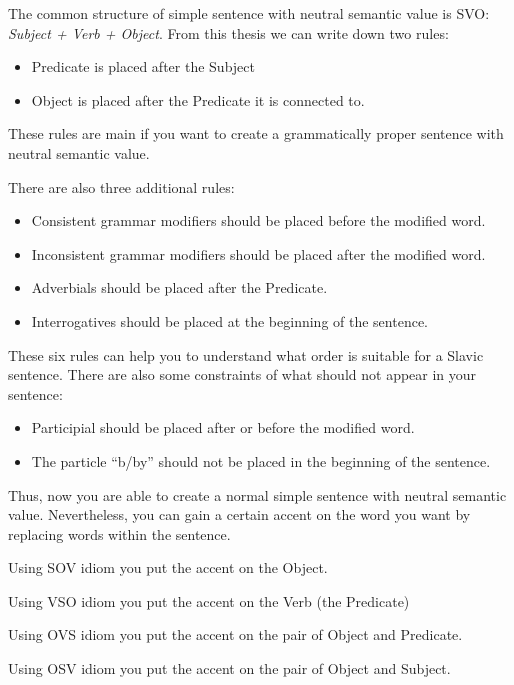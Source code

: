 The common structure of simple sentence with neutral semantic value is SVO: \textit{Subject + Verb + Object}. From this thesis we can write down two rules:

\begin{itemize}
	\item Predicate is placed after the Subject
	\item Object is placed after the Predicate it is connected to.
\end{itemize}

These rules are main if you want to create a grammatically proper sentence with neutral semantic value. 

There are also three additional rules:

\begin{itemize}
	\item Consistent grammar modifiers should be placed before the modified word.
	\item Inconsistent grammar modifiers should be placed after the modified word.
	\item Adverbials should be placed after the Predicate.
	\item Interrogatives should be placed at the beginning of the sentence.
\end{itemize}

These six rules can help you to understand what order is suitable for a Slavic sentence. There are also some constraints of what should not appear in your sentence:

\begin{itemize}
	\item Participial should be placed after or before the modified word.
	\item The particle “b/by” should not be placed in the beginning of the sentence.
\end{itemize}

Thus, now you are able to create a normal simple sentence with neutral semantic value. Nevertheless, you can gain a certain accent on the word you want by replacing words within the sentence.

Using SOV idiom you put the accent on the Object. 

Using VSO idiom you put the accent on the Verb (the Predicate)

Using OVS idiom you put the accent on the pair of Object and Predicate.

Using OSV idiom you put the accent on the pair of Object and Subject.

